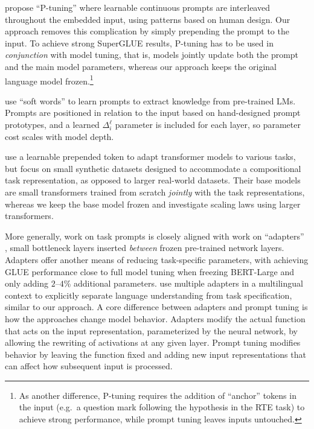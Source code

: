 \citet{liu2021gpt} propose ``P-tuning'' where learnable continuous prompts are interleaved throughout the embedded input, using patterns based on human design. Our approach removes this complication by simply prepending the prompt to the input. To achieve strong SuperGLUE results, P-tuning has to be used in \emph{conjunction} with model tuning, that is, models jointly update both the prompt and the main model parameters, whereas our approach keeps the original language model frozen.\footnote{As another difference, P-tuning requires the addition of ``anchor'' tokens in the input (e.g.\ a question mark following the hypothesis in the RTE task) to achieve strong performance, while prompt tuning leaves inputs untouched.}

\citet{qinLearningHowAsk2021} use ``soft words'' to learn prompts to extract knowledge from pre-trained LMs. Prompts are positioned in relation to the input based on hand-designed prompt prototypes, and a learned $\Delta_i^{\ell}$ parameter is included for each layer, so parameter cost scales with model depth.

\citet{logeswaranFewshotSequenceLearning2020} use a learnable prepended token to adapt transformer models to various tasks, but focus on small synthetic datasets designed to accommodate a compositional task representation, as opposed to larger real-world datasets. Their base models are small transformers trained from scratch \emph{jointly} with the task representations, whereas we keep the base model frozen and investigate scaling laws using larger transformers.

More generally, work on task prompts is closely aligned with work on ``adapters'' \cite{rebuffi_2017_adapters, houlsby_2019_adapters}, small bottleneck layers inserted \emph{between} frozen pre-trained network layers. Adapters offer another means of reducing task-specific parameters, with \citet{houlsby_2019_adapters} achieving GLUE performance close to full model tuning when freezing BERT-Large and only adding $2$--$4$\% additional parameters. \citet{pfeiffer-etal-2020-mad} use multiple adapters in a multilingual context to explicitly separate language understanding from task specification, similar to our approach. A core difference between adapters and prompt tuning is how the approaches change model behavior. Adapters modify the actual function that acts on the input representation, parameterized by the neural network, by allowing the rewriting of activations at any given layer. Prompt tuning modifies behavior by leaving the function fixed and adding new input representations that can affect how subsequent input is processed.

